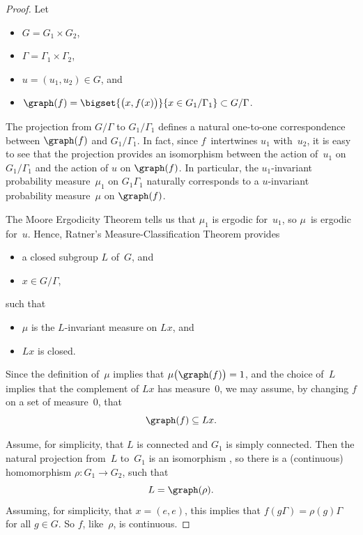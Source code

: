 \begin{proof}
Let
	\begin{itemize}
	\item $G = G_1 \times G_2$,
	\item $\Gamma = \Gamma_1 \times \Gamma_2$,
	\item $u = (u_1,u_2) \in G$,
	and
	\item $\graph(f) = \bigset{ \bigl( x, f(x) \bigr) }{ x \in G_1/\Gamma_1 } \subset G/\Gamma$.
	\end{itemize}
The projection from $G/\Gamma$ to $G_1/\Gamma_1$ defines a natural one-to-one correspondence between $\graph(f)$ and $G_1/\Gamma_1$. In fact, since $f$~intertwines $u_1$ with~$u_2$, it is easy to see that the projection provides an isomorphism between the action of~$u_1$ on $G_1/\Gamma_1$ and the action of $u$ on $\graph(f)$.
In particular, the $u_1$-invariant probability measure~$\mu_1$ on $G_1\Gamma_1$ naturally corresponds to a $u$-invariant probability measure~$\mu$ on $\graph(f)$.

The 
	Moore Ergodicity Theorem  
tells us that $\mu_1$ is ergodic for~$u_1$, so $\mu$~is ergodic for~$u$. Hence, Ratner's Measure-Classification Theorem  provides
	\begin{itemize}
	\item a closed subgroup $L$ of~$G$,
	and
	\item $x \in G/\Gamma$,
	\end{itemize}
such that 
	\begin{itemize}
	\item $\mu$ is the $L$-invariant measure on $L x$,
	and
	\item $L x$ is closed.
	\end{itemize}
Since the definition of~$\mu$ implies that  $\mu \bigl( \graph(f) \bigr) = 1$, and the choice of~$L$ implies that the complement of $L x$ has measure~$0$, we may assume, by changing $f$ on a set of measure~$0$, that 
	$$\graph(f) \subseteq Lx .$$

Assume, for simplicity, that $L$ is connected and $G_1$ is simply connected. Then the natural projection from~$L$ to~$G_1$ is an isomorphism , so there is a (continuous) homomorphism $\rho \colon G_1 \to G_2$, such that 
	$$L = \graph(\rho) .$$
Assuming, for simplicity, that $x = (e,e)$, this implies that $f(g \Gamma) = \rho(g) \Gamma$ for all $g \in G$. So $f$, like~$\rho$, is continuous.
\end{proof}

